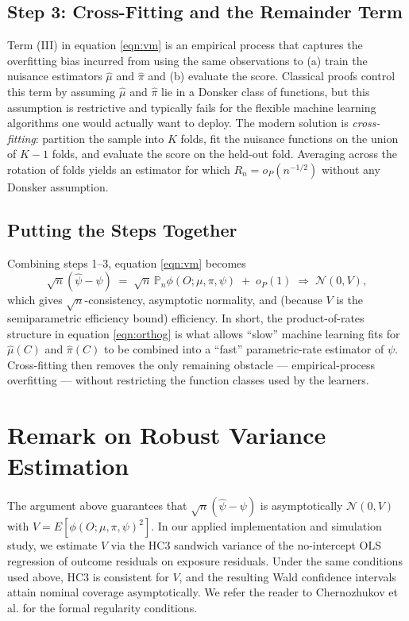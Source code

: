 \documentclass[12pt]{article}
\newcommand{\Pn}{\mathbb{P}_n}
\begin{document}
\subsection{Step 3: Cross-Fitting and the Remainder Term}

Term (III) in equation \ref{eqn:vm} is an empirical process that captures the overfitting bias incurred from using the same observations to (a) train the nuisance estimators $\hat{\mu}$ and $\hat{\pi}$ and (b) evaluate the score. Classical proofs control this term by assuming $\hat{\mu}$ and $\hat{\pi}$ lie in a Donsker class of functions, but this assumption is restrictive and typically fails for the flexible machine learning algorithms one would actually want to deploy.\cite{Kennedy2024} The modern solution is \emph{cross-fitting}: partition the sample into $K$ folds, fit the nuisance functions on the union of $K - 1$ folds, and evaluate the score on the held-out fold. Averaging across the rotation of folds yields an estimator for which $R_n = o_P(n^{-1/2})$ without any Donsker assumption.\cite{Chernozhukov2018, Zivich2022}

\subsection{Putting the Steps Together}

Combining steps 1--3, equation \ref{eqn:vm} becomes
$$\sqrt{n}(\hat{\psi} - \psi) \;=\; \sqrt{n} \, \Pn \phi(O; \mu, \pi, \psi) \;+\; o_P(1) \;\Rightarrow\; \mathcal{N}(0, V),$$
which gives $\sqrt{n}$-consistency, asymptotic normality, and (because $V$ is the semiparametric efficiency bound) efficiency. In short, the product-of-rates structure in equation \ref{eqn:orthog} is what allows ``slow'' machine learning fits for $\hat{\mu}(C)$ and $\hat{\pi}(C)$ to be combined into a ``fast'' parametric-rate estimator of $\psi$. Cross-fitting then removes the only remaining obstacle --- empirical-process overfitting --- without restricting the function classes used by the learners.

\section{Remark on Robust Variance Estimation}

The argument above guarantees that $\sqrt{n}(\hat{\psi} - \psi)$ is asymptotically $\mathcal{N}(0, V)$ with $V = E[\phi(O; \mu, \pi, \psi)^2]$. In our applied implementation and simulation study, we estimate $V$ via the HC3 sandwich variance of the no-intercept OLS regression of outcome residuals on exposure residuals. Under the same conditions used above, HC3 is consistent for $V$, and the resulting Wald confidence intervals attain nominal coverage asymptotically. We refer the reader to Chernozhukov et al.\cite{Chernozhukov2018} for the formal regularity conditions.

\newpage



\end{document}
